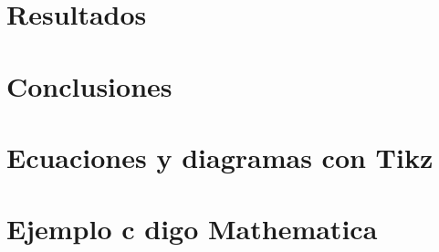 \documentclass{article}
\begin{document}
\chapter{Resultados}


\chapter{Conclusiones}


\begin{appendices}


\chapter{Ecuaciones y diagramas con Tikz}


\chapter{Ejemplo c digo Mathematica}


\end{appendices}

\end{document}
